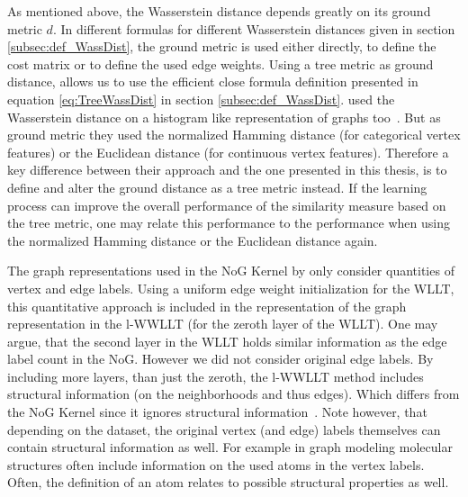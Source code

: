 		As mentioned above, the Wasserstein distance depends greatly on its ground metric $d$.
		In different formulas for different Wasserstein distances given in section \ref{subsec:def_WassDist}, the ground metric is used either directly, to define the cost matrix or to define the used edge weights.						
		Using a tree metric as ground distance, allows us to use the efficient close formula definition presented in equation \ref{eq:TreeWassDist} in section \ref{subsec:def_WassDist}.
		\citeauthor{2019_Togninalli_NIPS} used the Wasserstein distance on a histogram like representation of graphs too~\cite{2019_Togninalli_NIPS}.
		But as ground metric they used the normalized Hamming distance (for categorical vertex features) or the Euclidean distance (for continuous vertex features).
		Therefore a key difference between their approach and the one presented in this thesis, is to define and alter the ground distance as a tree metric instead.		
		If the learning process can improve the overall performance of the similarity measure based on the tree metric, one may relate this performance to the performance when using the normalized Hamming distance or the Euclidean distance again.
		
		The graph representations used in the NoG Kernel by \citeauthor{2019_Schulz_CONF} only consider quantities of vertex and edge labels.
		Using a uniform edge weight initialization for the WLLT, this quantitative approach is included in the representation of the graph representation in the l-WWLLT (for the zeroth layer of the WLLT).
		One may argue, that the second layer in the WLLT holds similar information as the edge label count in the NoG.
		However we did not consider original edge labels.
		By including more layers, than just the zeroth, the l-WWLLT method includes structural information (on the neighborhoods and thus edges).
		Which differs from the NoG Kernel since it ignores structural information~\cite{2019_Schulz_CONF}.
		Note however, that depending on the dataset, the original vertex (and edge) labels themselves can contain structural information as well.
		For example in graph modeling molecular structures often include information on the used atoms in the vertex labels.
		Often, the definition of an atom relates to possible structural properties as well.
		
